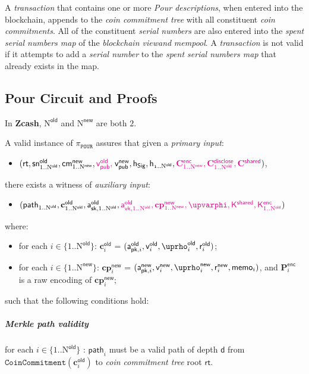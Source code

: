 \documentclass{article}
\newcommand{\changedcolor}{magenta}
\newcommand{\setchanged}{\color{\changedcolor}}
\newcommand{\changed}[1]{{\setchanged{#1}}}
\newcommand{\term}[1]{\textsl{#1}\xspace}
\newcommand{\termbf}[1]{\textbf{#1}\xspace}
\newcommand{\Zcash}{\termbf{Zcash}}
\newcommand{\coinCommitments}{\term{coin commitments}}
\newcommand{\coinCommitmentTree}{\term{coin commitment tree}}
\newcommand{\PourDescriptions}{\term{Pour descriptions}}
\newcommand{\transaction}{\term{transaction}}
\newcommand{\blockchainview}{\term{blockchain view}}
\newcommand{\mempool}{\term{mempool}}
\newcommand{\serialNumber}{\term{serial number}}
\newcommand{\serialNumbers}{\term{serial numbers}}
\newcommand{\spentSerialsMap}{\term{spent serial numbers map}}
\newcommand{\AuthPublicOld}[1]{\mathsf{a^{old}_{pk,\mathnormal{#1}}}}
\newcommand{\DiscloseKeyOld}[1]{\mathsf{a^{old}_{vk,\mathnormal{#1}}}}
\newcommand{\AuthPrivateOld}[1]{\mathsf{a^{old}_{sk,\mathnormal{#1}}}}
\newcommand{\AuthPublicNew}[1]{\mathsf{a^{new}_{pk,\mathnormal{#1}}}}
\newcommand{\enc}{\mathsf{enc}}
\newcommand{\disclose}{\mathsf{disclose}}
\newcommand{\shared}{\mathsf{shared}}
\newcommand{\CoinCommitRandOld}[1]{\mathsf{r^{old}_\mathnormal{#1}}}
\newcommand{\CoinCommitRandNew}[1]{\mathsf{r^{new}_\mathnormal{#1}}}
\newcommand{\CoinAddressRandOld}[1]{\mathsf{\uprho^{old}_\mathnormal{#1}}}
\newcommand{\CoinAddressRandNew}[1]{\mathsf{\uprho^{new}_\mathnormal{#1}}}
\newcommand{\CoinAddressPreRand}{\mathsf{\upvarphi}}
\newcommand{\Memo}{\mathsf{memo}}
\newcommand{\Plaintext}{\mathbf{P}}
\newcommand{\Ciphertext}{\mathbf{C}}
\newcommand{\Key}{\mathsf{K}}
\newcommand{\TransmitPlaintext}[1]{\Plaintext^\enc_{#1}}
\newcommand{\TransmitCiphertext}[1]{\Ciphertext^\enc_{#1}}
\newcommand{\TransmitKey}[1]{\Key^\enc_{#1}}
\newcommand{\DiscloseCiphertext}[1]{\Ciphertext^\disclose_{#1}}
\newcommand{\SharedCiphertext}{\Ciphertext^\shared}
\newcommand{\SharedKey}[1]{\Key^\shared_{#1}}
\newcommand{\cmNew}[1]{\mathsf{{cm}^{new}_\mathnormal{#1}}}
\newcommand{\MerkleDepth}{\mathsf{d}}
\newcommand{\snOld}[1]{\mathsf{{sn}^{old}_\mathnormal{#1}}}
\newcommand{\rt}{\mathsf{rt}}
\newcommand{\hSig}{\mathsf{h_{Sig}}}
\newcommand{\h}[1]{\mathsf{h_{\mathnormal{#1}}}}
\newcommand{\NOld}{\mathrm{N}^\mathsf{old}}
\newcommand{\NNew}{\mathrm{N}^\mathsf{new}}
\newcommand{\PourStatement}{\texttt{POUR}}
\newcommand{\PourProof}{\pi_{\PourStatement}}
\newcommand{\vpubOld}{\mathsf{v_{pub}^{old}}}
\newcommand{\vpubNew}{\mathsf{v_{pub}^{new}}}
\newcommand{\cOld}[1]{\mathbf{c}_{#1}^\mathsf{old}}
\newcommand{\cpNew}[1]{\mathbf{cp}_{#1}^\mathsf{new}}
\newcommand{\vOld}[1]{\mathsf{v}_{#1}^\mathsf{old}}
\newcommand{\vNew}[1]{\mathsf{v}_{#1}^\mathsf{new}}
\newcommand{\treepath}[1]{\mathsf{path}_{#1}}
\newcommand{\CoinCommitment}{\mathtt{CoinCommitment}}
\begin{document}
A \transaction that contains one or more \PourDescriptions, when entered into the 
blockchain, appends to the \coinCommitmentTree with all constituent 
\coinCommitments. All of the constituent \serialNumbers are also entered into the 
\spentSerialsMap of the \blockchainview \emph{and} \mempool. A \transaction is not 
valid if it attempts to add a \serialNumber to the \spentSerialsMap that already 
exists in the map.

\subsection{Pour Circuit and Proofs}

In \Zcash, $\NOld$ and $\NNew$ are both $2$.

A valid instance of $\PourProof$ assures that given a \term{primary input}:

\begin{itemize}
  \item[] $(\rt, \snOld{\mathrm{1}..\NOld}, \cmNew{\mathrm{1}..\NNew}, \changed{\vpubOld,\;}
\vpubNew, \hSig, \h{1..\NOld}, \changed{\TransmitCiphertext{1..\NNew},
\DiscloseCiphertext{1..\NOld}, \SharedCiphertext})$,
\end{itemize}

there exists a witness of \term{auxiliary input}:

\begin{itemize}
  \item[] $(\treepath{1..\NOld}, \cOld{1..\NOld}, \AuthPrivateOld{\mathrm{1}..\NOld},
\changed{\DiscloseKeyOld{\mathrm{1}..\NOld}, \cpNew{1..\NNew},
\CoinAddressPreRand, \SharedKey{}, \TransmitKey{1..\NOld}})$
\end{itemize}

where:

\begin{itemize}
  \item[] for each $i \in \{1..\NOld\}$: $\cOld{i}$ = $(\AuthPublicOld{i},
\vOld{i}, \CoinAddressRandOld{i}, \CoinCommitRandOld{i})$;
  \item[] for each $i \in \{1..\NNew\}$: $\cpNew{i}$ = $(\AuthPublicNew{i},
\vNew{i}, \CoinAddressRandNew{i}, \CoinCommitRandNew{i}, \Memo_i)$,
and $\TransmitPlaintext{i}$ is a raw encoding of $\cpNew{i}$;
\end{itemize}

such that the following conditions hold:

\subparagraph{Merkle path validity}

for each $i \in \{1..\NOld\}$ \changed{$\mid$ $\vOld{i} \neq 0$}:
$\treepath{i}$ must be a valid path of depth $\MerkleDepth$ from \linebreak
$\CoinCommitment(\cOld{i})$ to \coinCommitmentTree root $\rt$.
\end{document}
